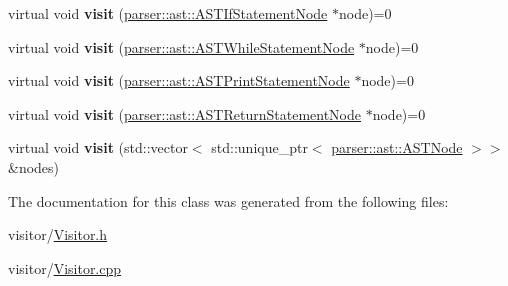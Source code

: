 \begin{DoxyCompactItemize}
\item 
\mbox{\label{classvisitor_1_1Visitor_ad5261c66b0f5e2be160b84238c66d402}} 
virtual void {\bfseries visit} (\hyperlink{classparser_1_1ast_1_1ASTIfStatementNode}{parser\+::ast\+::\+A\+S\+T\+If\+Statement\+Node} $\ast$node)=0
\item 
\mbox{\label{classvisitor_1_1Visitor_aab7f6df666a533dc45b1b08b827544a5}} 
virtual void {\bfseries visit} (\hyperlink{classparser_1_1ast_1_1ASTWhileStatementNode}{parser\+::ast\+::\+A\+S\+T\+While\+Statement\+Node} $\ast$node)=0
\item 
\mbox{\label{classvisitor_1_1Visitor_a7a60a1a4195ee1d0783c65cd206e8f6f}} 
virtual void {\bfseries visit} (\hyperlink{classparser_1_1ast_1_1ASTPrintStatementNode}{parser\+::ast\+::\+A\+S\+T\+Print\+Statement\+Node} $\ast$node)=0
\item 
\mbox{\label{classvisitor_1_1Visitor_aa25bc7baa436c4ba4817b48b4d4d847c}} 
virtual void {\bfseries visit} (\hyperlink{classparser_1_1ast_1_1ASTReturnStatementNode}{parser\+::ast\+::\+A\+S\+T\+Return\+Statement\+Node} $\ast$node)=0
\item 
\mbox{\label{classvisitor_1_1Visitor_a617a1b5872f90a1fcf4a09a1f8ae6999}} 
virtual void {\bfseries visit} (std\+::vector$<$ std\+::unique\+\_\+ptr$<$ \hyperlink{classparser_1_1ast_1_1ASTNode}{parser\+::ast\+::\+A\+S\+T\+Node} $>$$>$ \&nodes)
\end{DoxyCompactItemize}


The documentation for this class was generated from the following files\+:\begin{DoxyCompactItemize}
\item 
visitor/\hyperlink{Visitor_8h}{Visitor.\+h}\item 
visitor/\hyperlink{Visitor_8cpp}{Visitor.\+cpp}\end{DoxyCompactItemize}
